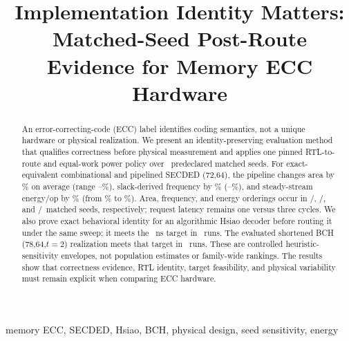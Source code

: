 \documentclass[conference,10pt]{IEEEtran}
\title{Implementation Identity Matters: Matched-Seed Post-Route Evidence for Memory ECC Hardware}
\author{\IEEEauthorblockN{Anonymous submission}}
\begin{document}
\maketitle

\begin{abstract}
An error-correcting-code (ECC) label identifies coding semantics, not a unique hardware or physical realization. We present an identity-preserving evaluation method that qualifies correctness before physical measurement and applies one pinned RTL-to-route and equal-work power policy over \SeedCount\ predeclared matched seeds. For exact-equivalent combinational and pipelined SECDED (72,64), the pipeline changes area by \SecAreaEffectMean\% on average (range \SecAreaEffectMin--\SecAreaEffectMax\%), slack-derived frequency by \SecFreqEffectMean\% (\SecFreqEffectMin--\SecFreqEffectMax\%), and steady-stream energy/op by \SecEnergyEffectMean\% (from \SecEnergyEffectMin\% to \SecEnergyEffectMax\%). Area, frequency, and energy orderings occur in \AreaOrderingCount/\SeedCount, \FreqOrderingCount/\SeedCount, and \EnergyOrderingCount/\SeedCount\ matched seeds, respectively; request latency remains one versus three cycles. We also prove exact behavioral identity for an algorithmic Hsiao decoder before routing it under the same sweep; it meets the \ClockPeriodNs~ns target in \HsiaoFeasible\ runs. The evaluated shortened BCH (78,64,$t=2$) realization meets that target in \BchFeasible\ runs. These are controlled heuristic-sensitivity envelopes, not population estimates or family-wide rankings. The results show that correctness evidence, RTL identity, target feasibility, and physical variability must remain explicit when comparing ECC hardware.
\end{abstract}

\begin{IEEEkeywords}
memory ECC, SECDED, Hsiao, BCH, physical design, seed sensitivity, energy
\end{IEEEkeywords}









\clearpage


\end{document}
